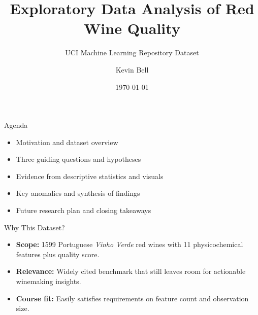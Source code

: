 \documentclass[aspectratio=169]{beamer}
\title{Exploratory Data Analysis of Red Wine Quality}
\subtitle{UCI Machine Learning Repository Dataset}
\author{Kevin Bell}
\date{\today}
\begin{document}
\begin{frame}
  \titlepage
\end{frame}

\begin{frame}{Agenda}
  \begin{itemize}
    \item Motivation and dataset overview
    \item Three guiding questions and hypotheses
    \item Evidence from descriptive statistics and visuals
    \item Key anomalies and synthesis of findings
    \item Future research plan and closing takeaways
  \end{itemize}
\end{frame}

\begin{frame}{Why This Dataset?}
  \begin{itemize}
    \item \textbf{Scope:} \num{1599} Portuguese \emph{Vinho Verde} red wines with \num{11} physicochemical features plus quality score.
    \item \textbf{Relevance:} Widely cited benchmark that still leaves room for actionable winemaking insights.
    \item \textbf{Course fit:} Easily satisfies requirements on feature count and observation size.
  \end{itemize}
\end{frame}
\end{document}
